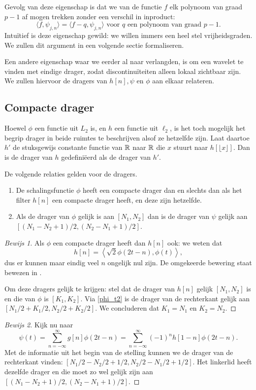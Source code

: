 Gevolg van deze eigenschap is dat we van de functie $f$ elk polynoom van graad $p-1$ af mogen trekken zonder een verschil in inproduct:
\[
\langle f, \psi_{j,n} \rangle = \langle f - q, \psi_{j,n} \rangle \text{ voor $q$ een polynoom van graad $p-1$}.
\]
Intu\"itief is deze eigenschap gewild: we willen immers een heel stel vrijheidsgraden. 
We zullen dit argument in een volgende sectie formaliseren.

Een andere eigenschap waar we eerder al naar verlangden, is om een wavelet te vinden met eindige drager, 
zodat discontinu\"iteiten alleen lokaal zichtbaar zijn. 
We zullen hiervoor de dragers van $h[n], \psi$ en $\phi$ aan elkaar relateren.

\subsection{Compacte drager}
Hoewel $\phi$ een functie uit $L_2$ is, en $h$ een functie uit $\ell_2$, is het toch mogelijk het begrip drager in beide ruimtes te beschrijven alsof ze hetzelfde zijn. Laat daartoe $h'$ de stuksgewijs constante functie van $\mathbb{R}$ naar $\mathbb{R}$ die $x$ stuurt naar $h\left [\lfloor x \rfloor\right ]$. Dan is de drager van $h$ gedefini\"eerd als de drager van $h'$.

\begin{stelling}
  De volgende relaties gelden voor de dragers.
  \begin{enumerate}
  \item De schalingsfunctie $\phi$ heeft een compacte drager dan en slechts dan als het filter $h[n]$ een compacte drager heeft, en deze zijn hetzelfde.
  \item Als de drager van $\phi$ gelijk is aan $[N_1,N_2]$ dan is de drager van $\psi$ gelijk aan $[(N_1 - N_2 + 1)/2, (N_2 - N_1 + 1)/2]$.
  \end{enumerate}
\end{stelling}
\begin{proof}[Bewijs 1] Als $\phi$ een compacte drager heeft dan $h[n]$ ook: we weten dat
  \begin{equation*}
    h[n] = \left\langle \sqrt{2} \phi\left(2t-n\right), \phi(t) \right\rangle,
  \end{equation*}
  dus er kunnen maar eindig veel $n$ ongelijk nul zijn. De omgekeerde bewering staat bewezen in 
  \cite[P965-967]{daubechies}.

  Om deze dragers gelijk te krijgen: stel dat de drager van $h[n]$ gelijk $[N_1,N_2]$ is
  en die van $\phi$ is $[K_1, K_2]$. Via \eqref{phi_t2} is de drager van de rechterkant gelijk aan $[N_1/2 + K_1/2, N_2/2 + K_2/2]$. We concluderen dat $K_1 = N_1$ en $K_2 = N_2$.
\end{proof}
\begin{proof}[Bewijs 2]
  Kijk nu naar
  \[
  \psi\left(t\right) = \sum_{n=-\infty}^{\infty} g[n] \phi(2t-n) = \sum_{n=-\infty}^{\infty} (-1)^{n}h[1-n] \phi(2t-n).
  \]
  Met de informatie uit het begin van de stelling kunnen we de drager van de rechterkant vinden: $[N_1/2 - N_2/2 + 1/2, N_2/2 - N_1/2 + 1/2]$. Het linkerlid heeft dezelfde drager en die moet zo wel gelijk zijn aan $[(N_1 - N_2 + 1)/2, (N_2 - N_1 + 1)/2]$.
\end{proof}

